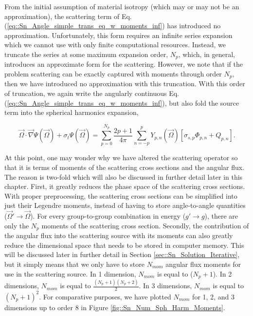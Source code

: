From the initial assumption of material isotropy (which may or may not be an approximation), the scattering term of Eq. (\ref{eq::Sn_Angle_simple_trans_eq_w_moments_inf}) has introduced no approximation. Unfortunately, this form requires an infinite series expansion which we cannot use with only finite computational resources. Instead, we truncate the series at some maximum expansion order, $N_p$, which, in general, introduces an approximate form for the scattering. However, we note that if the problem scattering can be exactly captured with moments through order $N_p$, then we have introduced no approximation with this truncation. With this order of truncation, we again write the angularly continuous Eq. (\ref{eq::Sn_Angle_simple_trans_eq_w_moments_inf}), but also fold the source term into the spherical harmonics expansion,

\begin{equation}
\label{eq::Sn_Angle_simple_trans_eq_w_moments_trunc}
\vec{\Omega} \cdot \vec{\nabla} \Psi (\vec{\Omega}) + \sigma_t \Psi (\vec{\Omega}) = \sum_{p=0}^{N_p} \frac{2p + 1}{4 \pi}   \sum_{n=-p}^{p}   Y_{p,n} (  \vec{\Omega} ) \left[ \sigma_{s,p} \Phi_{p,n} + Q_{p,n}  \right] .
\end{equation}

At this point, one may wonder why we have altered the scattering operator so that it is terms of moments of the scattering cross sections and the angular flux. The reason is two-fold which will also be discussed in further detail later in this chapter. First, it greatly reduces the phase space of the scattering cross sections. With proper preprocessing, the scattering cross sections can be simplified into just their Legendre moments, instead of having to store angle-to-angle quantities ($\vec{\Omega}' \rightarrow \vec{\Omega}$). For every group-to-group combination in energy ($g' \rightarrow g$), there are only the $N_p$ moments of the scattering cross section. Secondly, the contribution of the angular flux into the scattering source with its moments can also greatly reduce the dimensional space that needs to be stored in computer memory. This will be discussed later in further detail in Section \ref{sec::Sn_Solution_Iterative}, but it simply means that we only have to store $N_{mom}$ angular flux moments for use in the scattering source. In 1 dimension, $N_{mom}$ is equal to ($N_p + 1$). In 2 dimensions, $N_{mom}$ is equal to $\frac{(N_p + 1) (N_p + 2)}{2}$. In 3 dimensions, $N_{mom}$ is equal to $(N_p + 1)^2$. For comparative purposes, we have plotted $N_{mom}$ for 1, 2, and 3 dimensions up to order 8 in Figure \ref{fig::Sn_Num_Sph_Harm_Moments}.

